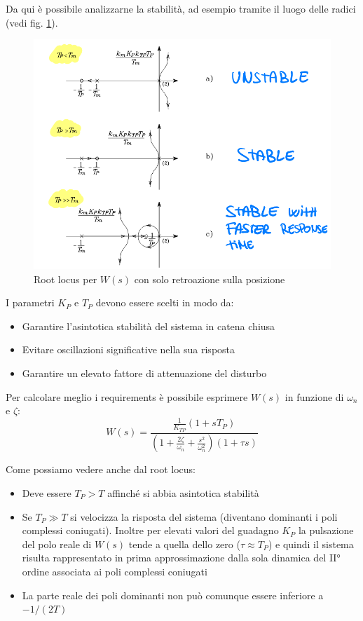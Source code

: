 Da qui è possibile analizzarne la stabilità, ad esempio tramite il luogo delle radici (vedi fig. \ref{fig:rootlocus1}).

\begin{figure}[ht!]
	\centering
	\includegraphics[width=0.7\linewidth]{images/root_locus_1}
	\caption{Root locus per $W(s)$ con solo retroazione sulla posizione}
	\label{fig:rootlocus1}
\end{figure}


I parametri $K_P$ e $T_P$ devono essere scelti in modo da:
\begin{itemize}
	\item Garantire l’asintotica stabilità del sistema in catena chiusa
	\item Evitare oscillazioni significative nella sua risposta
	\item Garantire un elevato fattore di attenuazione del disturbo 
\end{itemize}


Per calcolare meglio i requirements è possibile esprimere $W(s)$ in funzione di $\omega_n$ e $\zeta$:
$$
W(s) = \frac{\frac{1}{K_{TP}}(1+sT_P)}{\left( 1 + \frac{2\zeta}{\omega_n} + \frac{s^2}{\omega_n^2} \right) (1+\tau s) }
$$

Come possiamo vedere anche dal root locus:
\begin{itemize}
	\item Deve essere $T_P > T$ affinché si abbia asintotica stabilità
	\item Se $T_P \gg T$ si velocizza la risposta del sistema (diventano dominanti i poli complessi coniugati). Inoltre per elevati valori del guadagno $K_P$ la pulsazione del polo reale di $W(s)$ tende a quella dello zero ($\tau \approx T_P$) e quindi il sistema risulta rappresentato in prima approssimazione dalla sola dinamica del II° ordine associata ai poli complessi coniugati
	\item La parte reale dei poli dominanti non può comunque essere inferiore a $-1/(2T)$
\end{itemize}

